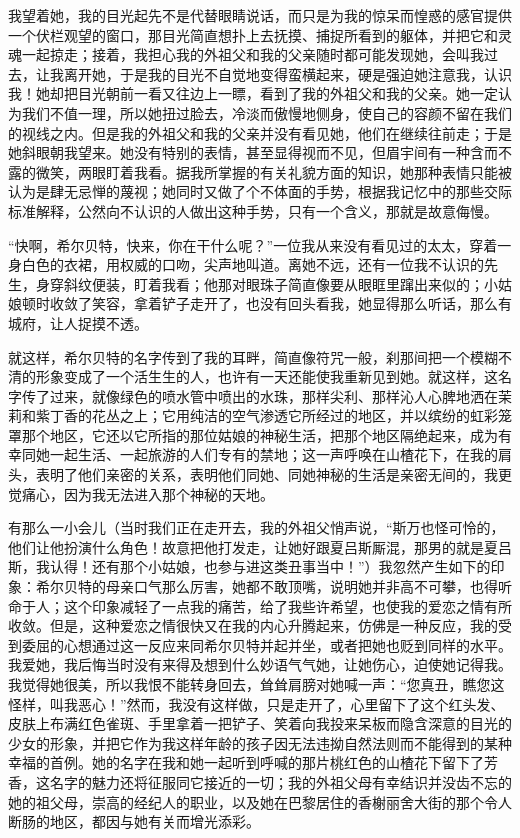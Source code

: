 \par 我望着她，我的目光起先不是代替眼睛说话，而只是为我的惊呆而惶惑的感官提供一个伏栏观望的窗口，那目光简直想扑上去抚摸、捕捉所看到的躯体，并把它和灵魂一起掠走；接着，我担心我的外祖父和我的父亲随时都可能发现她，会叫我过去，让我离开她，于是我的目光不自觉地变得蛮横起来，硬是强迫她注意我，认识我！她却把目光朝前一看又往边上一瞟，看到了我的外祖父和我的父亲。她一定认为我们不值一理，所以她扭过脸去，冷淡而傲慢地侧身，使自己的容颜不留在我们的视线之内。但是我的外祖父和我的父亲并没有看见她，他们在继续往前走；于是她斜眼朝我望来。她没有特别的表情，甚至显得视而不见，但眉宇间有一种含而不露的微笑，两眼盯着我看。据我所掌握的有关礼貌方面的知识，她那种表情只能被认为是肆无忌惮的蔑视；她同时又做了个不体面的手势，根据我记忆中的那些交际标准解释，公然向不认识的人做出这种手势，只有一个含义，那就是故意侮慢。
\par “快啊，希尔贝特，快来，你在干什么呢？”一位我从来没有看见过的太太，穿着一身白色的衣裙，用权威的口吻，尖声地叫道。离她不远，还有一位我不认识的先生，身穿斜纹便装，盯着我看；他那对眼珠子简直像要从眼眶里蹿出来似的；小姑娘顿时收敛了笑容，拿着铲子走开了，也没有回头看我，她显得那么听话，那么有城府，让人捉摸不透。
\par 就这样，希尔贝特的名字传到了我的耳畔，简直像符咒一般，刹那间把一个模糊不清的形象变成了一个活生生的人，也许有一天还能使我重新见到她。就这样，这名字传了过来，就像绿色的喷水管中喷出的水珠，那样尖利、那样沁人心脾地洒在茉莉和紫丁香的花丛之上；它用纯洁的空气渗透它所经过的地区，并以缤纷的虹彩笼罩那个地区，它还以它所指的那位姑娘的神秘生活，把那个地区隔绝起来，成为有幸同她一起生活、一起旅游的人们专有的禁地；这一声呼唤在山楂花下，在我的肩头，表明了他们亲密的关系，表明他们同她、同她神秘的生活是亲密无间的，我更觉痛心，因为我无法进入那个神秘的天地。
\par 有那么一小会儿（当时我们正在走开去，我的外祖父悄声说，“斯万也怪可怜的，他们让他扮演什么角色！故意把他打发走，让她好跟夏吕斯厮混，那男的就是夏吕斯，我认得！还有那个小姑娘，也参与进这类丑事当中！”）我忽然产生如下的印象：希尔贝特的母亲口气那么厉害，她都不敢顶嘴，说明她并非高不可攀，也得听命于人；这个印象减轻了一点我的痛苦，给了我些许希望，也使我的爱恋之情有所收敛。但是，这种爱恋之情很快又在我的内心升腾起来，仿佛是一种反应，我的受到委屈的心想通过这一反应来同希尔贝特并起并坐，或者把她也贬到同样的水平。我爱她，我后悔当时没有来得及想到什么妙语气气她，让她伤心，迫使她记得我。我觉得她很美，所以我恨不能转身回去，耸耸肩膀对她喊一声：“您真丑，瞧您这怪样，叫我恶心！”然而，我没有这样做，只是走开了，心里留下了这个红头发、皮肤上布满红色雀斑、手里拿着一把铲子、笑着向我投来呆板而隐含深意的目光的少女的形象，并把它作为我这样年龄的孩子因无法违拗自然法则而不能得到的某种幸福的首例。她的名字在我和她一起听到呼喊的那片桃红色的山楂花下留下了芳香，这名字的魅力还将征服同它接近的一切；我的外祖父母有幸结识并没齿不忘的她的祖父母，崇高的经纪人的职业，以及她在巴黎居住的香榭丽舍大街的那个令人断肠的地区，都因与她有关而增光添彩。
